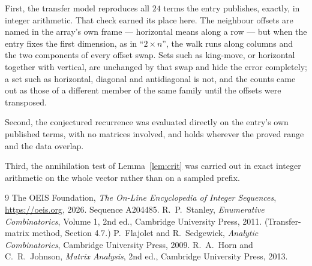 \documentclass[11pt,a4paper]{article}
\theoremstyle{plain}
\theoremstyle{definition}
\begin{document}
First, the transfer model reproduces all $24$ terms the entry publishes, exactly, in
integer arithmetic. That check earned its place here. The neighbour offsets are named in the
array's own frame --- horizontal means along a row --- but when the entry fixes the first
dimension, as in ``$2\times n$'', the walk runs along columns and the two components of every
offset swap. Sets such as king-move, or horizontal together with vertical, are unchanged by
that swap and hide the error completely; a set such as horizontal, diagonal and antidiagonal
is not, and the counts came out as those of a different member of the same family until the
offsets were transposed.

Second, the conjectured recurrence was evaluated directly on the entry's own published terms,
with no matrices involved, and holds wherever the proved range and the data overlap.

Third, the annihilation test of Lemma~\ref{lem:crit} was carried out in exact integer
arithmetic on the whole vector rather than on a sampled prefix.

\begin{thebibliography}{9}
 The OEIS Foundation, \emph{The On-Line Encyclopedia of Integer
Sequences}, \url{https://oeis.org}, 2026. Sequence A204485.
 R.~P.~Stanley, \emph{Enumerative Combinatorics}, Volume 1, 2nd ed.,
Cambridge University Press, 2011. (Transfer-matrix method, Section 4.7.)
 P.~Flajolet and R.~Sedgewick, \emph{Analytic Combinatorics}, Cambridge
University Press, 2009.
 R.~A.~Horn and C.~R.~Johnson, \emph{Matrix Analysis}, 2nd ed., Cambridge
University Press, 2013.
\end{thebibliography}
\end{document}

